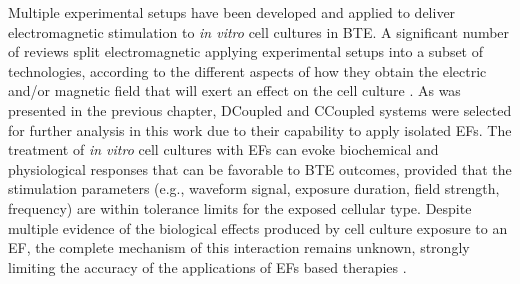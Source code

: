 Multiple experimental setups have been developed and applied to deliver electromagnetic stimulation to \textit{in vitro} cell cultures in \ac{BTE}. A significant number of reviews split electromagnetic applying experimental setups into a subset of technologies, according to the different aspects of how they obtain the electric and/or magnetic field that will exert an effect on the cell culture \cite{Thrivikraman2018-su, Funk2009-is}. As was presented in the previous chapter, \ac{DCoupled} and \ac{CCoupled} systems were selected for further analysis in this work due to their capability to apply isolated \ac{EF}s. The treatment of \textit{in vitro} cell cultures with \ac{EF}s can evoke biochemical and physiological responses that can be favorable to \ac{BTE} outcomes, provided that the stimulation parameters (e.g., waveform signal, exposure duration, field strength, frequency) are within tolerance limits for the exposed cellular type. Despite multiple evidence of the biological effects produced by cell culture exposure to an \ac{EF}, the complete mechanism of this interaction remains unknown, strongly limiting the accuracy of the applications of \ac{EFs} based therapies \cite{Taghian2015-hf}.


